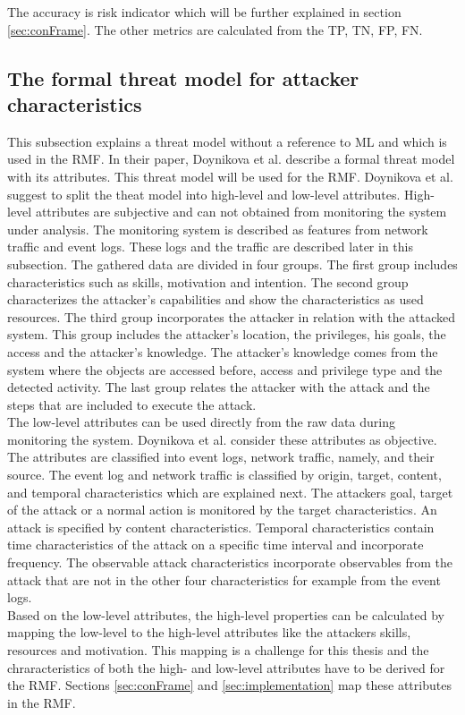 \noindent The accuracy is risk indicator which will be further explained in section \ref{sec:conFrame}. The other metrics are calculated from the TP, TN, FP, FN.

\subsection{The formal threat model for attacker characteristics}
\label{sec:threat}

This subsection explains a threat model without a reference to ML and which is used in the RMF. In their paper, Doynikova et al. \cite{DBLP:conf/crisis/DoynikovaNGK20} describe a formal threat model with its attributes. This threat model will be used for the RMF. Doynikova et al. suggest to split the theat model into high-level and low-level attributes.
High-level attributes are subjective and can not obtained from monitoring the system under analysis. The monitoring system is described as features from network traffic and event logs. These logs and the traffic are described later in this subsection. The gathered data are divided in four groups. The first group includes characteristics such as
skills, motivation and intention. The second group characterizes the attacker's capabilities and show the characteristics as used resources. The third group incorporates the attacker in
relation with the attacked system. This group includes the attacker's location, the privileges, his goals, the access and the attacker's knowledge. The attacker's knowledge comes from the
system where the objects are accessed before, access and privilege type and the detected activity. The last group relates the attacker with the attack and the steps that are included to
execute the attack. \\
The low-level attributes can be used directly from the raw data during monitoring the system. Doynikova et al. consider these attributes as objective. The attributes are classified into event logs, network traffic, namely, and their source. The event log and network traffic is classified by origin, target, content, and temporal characteristics \cite{DBLP:journals/ijcysa/FraunholzKAS17} which are explained next. The attackers goal, target of the attack or a normal action is monitored by the target characteristics. An attack is specified by content characteristics. Temporal
characteristics contain time characteristics of the attack on a specific time interval and incorporate frequency. The observable attack characteristics incorporate observables from the attack that are not in the other four characteristics for example from the event logs. \\
Based on the low-level attributes, the high-level properties can be calculated by mapping the low-level to the high-level attributes like the attackers skills, resources and motivation. This mapping is a challenge for this thesis and the chraracteristics of both the high- and low-level attributes have to be derived for the RMF. Sections \ref{sec:conFrame} and \ref{sec:implementation} map these attributes in the RMF.

